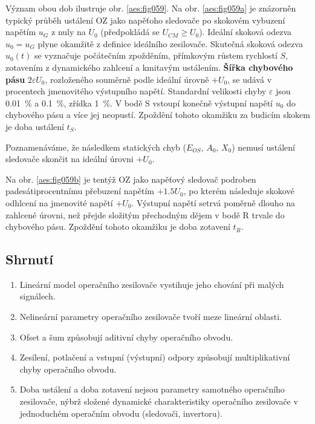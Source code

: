         Význam obou dob ilustruje obr. \ref{aes:fig059}. Na obr. \ref{aes:fig059a} je znázorněn
        typický průběh ustálení OZ jako napěťoho sledovače po skokovém vybuzení napětím \(u_G\) z
        nuly na \(U_0\) (předpokládá se \(U_{CM}\geq U_0\)). Ideální skoková odezva \(u_0 = u_G\)
        plyne okamžitě z definice ideálního zesilovače. Skutečná skoková odezva \(u_0(t)\) se
        vyznačuje počátečním zpožděním, přímkovým růstem rychlostí \(S\), zotavením z dynamického
        zahlcení a kmitavým ustálením. \textbf{Šířka chybového pásu} \(2\varepsilon U_0\),
        rozloženého souměrně podle ideální úrovně \(+U_0\), se udává v procentech jmenovitého
        výstupního napětí. Standardní velikosti chyby \(\varepsilon\) jsou \SI{0.01}{\percent} a
        \SI{0.1}{\percent}, zřídka \SI{1}{\percent}. V bodě S vstoupí konečně výstupní napětí
        \(u_0\) do chybového pásu a více jej neopustí. Zpoždění tohoto okamžiku za budicím skokem je
        doba ustálení \(t_S\).  

        Poznamenáváme, že následkem statických chyb (\(E_{OS}\), \(A_0\), \(X_0\)) nemusí ustálení
        sledovače skončit na ideální úrovni \(+U_0\).

        Na obr. \ref {aes:fig059b} je tentýž OZ jako napěťový sledovač podroben padesátiprocentnímu
        přebuzení napětím \(+\num{1.5}U_0\), po kterém následuje skokové odhlcení na jmenovité
        napětí \(+U_0\). Výstupní napětí setrvá poměrně dlouho na zahlcené úrovni, než přejde
        složitým přechodným dějem v bodě R trvale do chybového pásu. Zpoždění tohoto okamžiku je
        doba zotavení \(t_R\).
    
    \subsection{Shrnutí}\label{aesIchIIIsecIIssecIX}
      \begin{enumerate}[noitemsep]
        \item Lineární model operačního zesilovače vystihuje jeho chování při malých signálech. 
        \item Nelineární parametry operačního zesilovače tvoří meze lineární oblasti.
        \item Ofset a šum způsobují aditivní chyby operačního obvodu.
        \item Zesílení, potlačení a vstupní (výstupní) odpory způsobují multiplikativní
              chyby operačního obvodu.
        \item Doba ustálení a doba zotavení nejsou parametry samotného operačního zesilovače, nýbrž
              složené dynamické charakteristiky operačního zesilovače v jednoduchém operačním obvodu
              (sledovači, invertoru).           
      \end{enumerate}
      
